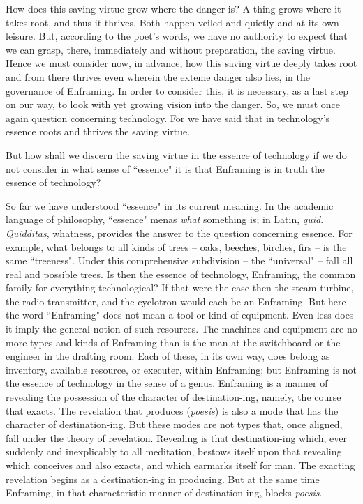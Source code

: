 \documentclass[paper=a4, fontsize=11pt,twoside]{scrartcl}
\begin{document}
How does this saving virtue grow where the danger is?  A thing grows where it takes root, and thus it thrives. Both happen veiled and quietly and at its own leisure.  But, according to the poet's words, we have no authority to expect that we can grasp, there, immediately and without preparation, the saving virtue. Hence we must consider now, in advance, how this saving virtue deeply takes root and from there thrives even wherein the exteme danger also lies, in the governance of Enframing. In order to consider this, it is necessary, as a last step on our way, to look with yet growing vision into the danger. So, we must once again question concerning technology. For we have said that in technology's essence roots and thrives the saving virtue.

But how shall we discern the saving virtue in the essence of technology if we do not consider in what sense of ``essence" it is that Enframing is in truth the essence of technology?

So far we have understood ``essence" in its current meaning. In the academic language of philosophy, ``essence" menas \textit{what} something is; in Latin, \textit{quid}. \textit{Quidditas}, whatness, provides the answer to the question concerning essence. For example, what belongs to all kinds of trees -- oaks, beeches, birches, firs -- is the same ``treeness". Under this comprehensive subdivision -- the ``universal" -- fall all real and possible trees. Is then the essence of technology, Enframing, the common family for everything technological? If that were the case then the steam turbine, the radio transmitter, and the cyclotron would each be an Enframing. But here the word ``Enframing" does not mean a tool or kind of equipment. Even less does it imply the general notion of such resources. The machines and equipment are no more types and kinds of Enframing than is the man at the switchboard or the engineer in the drafting room. Each of these, in its own way, does belong as inventory, available resource, or executer, within Enframing; but Enframing is not the essence of technology in the sense of a genus. Enframing is a manner of revealing the possession of the character of destination-ing, namely, the course that exacts. The revelation that produces (\textit{p{\-o}esis}) is also a mode that has the character of destination-ing. But these modes are not types that, once aligned, fall under the theory of revelation. Revealing is that destination-ing which, ever suddenly and inexplicably to all meditation, bestows itself upon that revealing which conceives and also exacts, and which earmarks itself for man. The exacting revelation begins as a destination-ing in producing. But at the same time Enframing, in that characteristic manner of destination-ing, blocks \textit{p{\-o}esis}.
\end{document}
